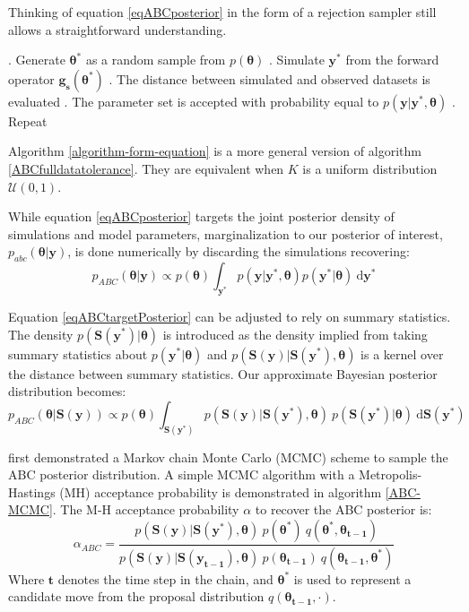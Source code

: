 Thinking of equation \ref{eqABCposterior} in the form of a rejection sampler still allows a straightforward understanding.
\begin{algorithm}[H]
	\caption{ }
	\begin{algorithmic}
		. Generate $\bm{\theta^*}$ as a random sample from $p(\bm{\theta})$		
		. Simulate $\bm{y^*}$ from the forward operator $\bm{g_s}(\bm{\theta^*})$		
		. The distance between simulated and observed datasets is evaluated		
		. The parameter set is accepted with probability equal to $p(\bm{y}|\bm{y^*},\bm{\theta})$	
		. Repeat
	\end{algorithmic}
	\label{algorithm-form-equation}
\end{algorithm}
Algorithm \ref{algorithm-form-equation} is a more general version of algorithm \ref{ABCfulldatatolerance}. They are equivalent when $K$ is a uniform distribution $\mathcal{U}(0,1)$.\par
While equation \ref{eqABCposterior} targets the joint posterior density of simulations and model parameters, marginalization to our posterior of interest, $p_{abc}(\bm{\theta}|\bm{y})$, is done numerically by discarding the simulations recovering:
\begin{equation}
p_{ABC}(\bm{\theta}|\bm{y}) \propto p(\bm{\theta}) \int_{\bm{y^*}} p(\bm{y}|\bm{y^*},\bm{\theta}) p(\bm{y^*}|\bm{\theta})\ \text{d}\bm{y^*}
\label{eqABCtargetPosterior}
\end{equation}\par

Equation \ref{eqABCtargetPosterior} can be adjusted to rely on summary statistics. The density $p(\bm{S}(\bm{y^*})|\bm{\theta})$ is introduced as the density implied from taking summary statistics about $p(\bm{y^*}|\bm{\theta})$ and $p(\bm{S}(\bm{y})|\bm{S}(\bm{y^*}),\bm{\theta})$ is a kernel over the distance between summary statistics. Our approximate Bayesian posterior distribution becomes:
\begin{equation}
p_{ABC}(\bm{\theta}|\bm{S}(\bm{y})) \propto p(\bm{\theta}) \int_{\bm{S}(\bm{y^*})} p(\bm{S}(\bm{y})|\bm{S}(\bm{y^*}),\bm{\theta})\  p(\bm{S}(\bm{y^*})|\bm{\theta})\ \text{d}\bm{S}(\bm{y^*})
\label{summary-stat-abc-posterior}
\end{equation}

\citet{Marjoram2003} first demonstrated a Markov chain Monte Carlo (MCMC) scheme to sample the ABC posterior distribution. A simple MCMC algorithm with a Metropolis-Hastings (MH) acceptance probability is demonstrated in algorithm \ref{ABC-MCMC}. The M-H acceptance probability $\alpha$ to recover the ABC posterior is:
\begin{equation}
\alpha_{ABC} = \frac{p(\bm{S}(\bm{y})|\bm{S}(\bm{y^*}),\bm{\theta})\ p(\bm{\theta^*})\ q(\bm{\theta^*},\bm{\theta_{t-1}})} {p(\bm{S}(\bm{y})|\bm{S}(\bm{y_{t-1}}),\bm{\theta})\ p(\bm{\theta_{t-1}})\ q(\bm{\theta_{t-1}},\bm{\theta^*})}
\label{M-H-acce}
\end{equation}
Where $\bm{t}$ denotes the time step in the chain, and $\bm{\theta^*}$ is used to represent a candidate move from the proposal distribution $q(\bm{\theta_{t-1}},\cdot)$.


